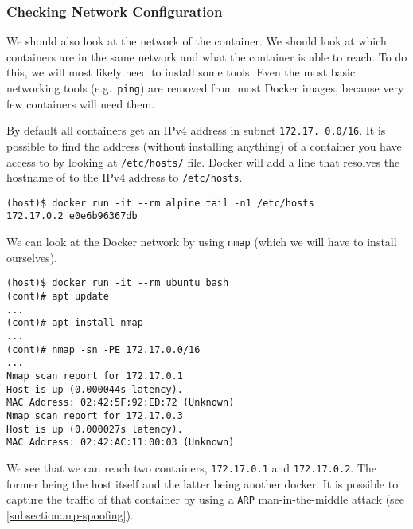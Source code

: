 \subsubsection{Checking Network Configuration}
We should also look at the network of the container. We should look at which containers are in the same network and what the container is able to reach. To do this, we will most likely need to install some tools. Even the most basic networking tools (e.g.\ \lstinline{ping}) are removed from most Docker images, because very few containers will need them.

By default all containers get an IPv4 address in subnet \lstinline{172.17. 0.0/16}. It is possible to find the address (without installing anything) of a container you have access to by looking at \lstinline{/etc/hosts/} file. Docker will add a line that resolves the hostname of to the IPv4 address to \lstinline{/etc/hosts}.

\begin{lstlisting}[caption={Last line of \lstinline{/etc/hosts} in Docker.},captionpos=b]
(host)$ docker run -it --rm alpine tail -n1 /etc/hosts
172.17.0.2 e0e6b96367db
\end{lstlisting}


We can look at the Docker network by using \lstinline{nmap} (which we will have to install ourselves).
\begin{lstlisting}[caption={\lstinline{nmap} scan inside container.},captionpos=b]
(host)$ docker run -it --rm ubuntu bash
(cont)# apt update
...
(cont)# apt install nmap
...
(cont)# nmap -sn -PE 172.17.0.0/16
...
Nmap scan report for 172.17.0.1
Host is up (0.000044s latency).
MAC Address: 02:42:5F:92:ED:72 (Unknown)
Nmap scan report for 172.17.0.3
Host is up (0.000027s latency).
MAC Address: 02:42:AC:11:00:03 (Unknown)
\end{lstlisting}

We see that we can reach two containers, \lstinline{172.17.0.1} and \lstinline{172.17.0.2}. The former being the host itself and the latter being another docker. It is possible to capture the traffic of that container by using a \lstinline{ARP} man-in-the-middle attack (see \autoref{subsection:arp-spoofing}).
